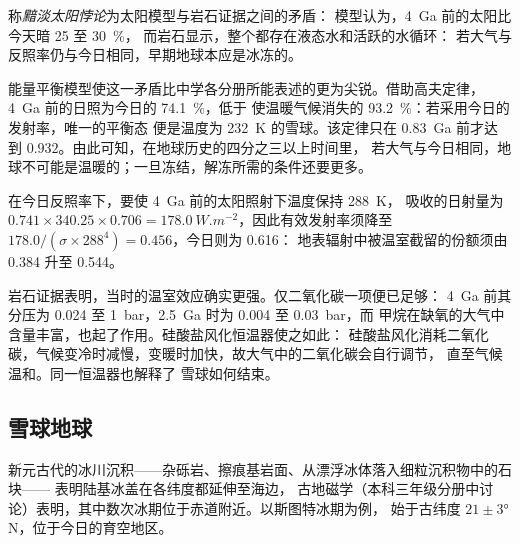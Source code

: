 \begin{definition}[黯淡太阳悖论]\label{def:b2:precambrian-earth:faint-sun}
称\emph{黯淡太阳悖论}为太阳模型与岩石证据之间的矛盾：
模型认为，\qty{4}{Ga} 前的太阳比今天暗 25 至 \qty{30}{\percent}，
而岩石显示，整个都存在液态水和活跃的水循环：
若大气与反照率仍与今日相同，早期地球本应是冰冻的。
\end{definition}

能量平衡模型使这一矛盾比中学各分册所能表述的更为尖锐。借助高夫定律，
\qty{4}{Ga} 前的日照为今日的 \qty{74.1}{\percent}，低于
使温暖气候消失的 \qty{93.2}{\percent}：若采用今日的发射率，唯一的平衡态
便是温度为 \qty{232}{K} 的雪球。该定律只在
\qty{0.83}{Ga} 前才达到 $0.932$。由此可知，在地球历史的四分之三以上时间里，
若大气与今日相同，地球不可能是温暖的；一旦冻结，解冻所需的条件还要更多。

\begin{example}[年轻地球的温室]\label{ex:b2:precambrian-earth:young-greenhouse}
在今日反照率下，要使 \qty{4}{Ga} 前的太阳照射下温度保持 \qty{288}{K}，
吸收的日射量为 $0.741\times340.25\times0.706 = \qty{178.0}{W.m^{-2}}$，因此有效发射率须降至
$178.0/(\sigma\times288^4) = 0.456$，今日则为 0.616：
地表辐射中被温室截留的份额须由 0.384 升至 0.544。
\end{example}

岩石证据表明，当时的温室效应确实更强。仅二氧化碳一项便已足够：
\qty{4}{Ga} 前其分压为 0.024 至 \qty{1}{bar}，\qty{2.5}{Ga} 时为 0.004 至 \qty{0.03}{bar}，而
甲烷在缺氧的大气中含量丰富，也起了作用。硅酸盐风化恒温器使之如此：
硅酸盐风化消耗二氧化碳，气候变冷时减慢，变暖时加快，故大气中的二氧化碳会自行调节，
直至气候温和。同一恒温器也解释了
雪球如何结束。

\subsection*{雪球地球}

新元古代的冰川沉积——杂砾岩、擦痕基岩面、从漂浮冰体落入细粒沉积物中的石块——
表明陆基冰盖在各纬度都延伸至海边，
古地磁学（本科三年级分册中讨论）表明，其中数次冰期位于赤道附近。以斯图特冰期为例，
始于古纬度 $21 \pm \ang{3}$\,N，位于今日的育空地区。

